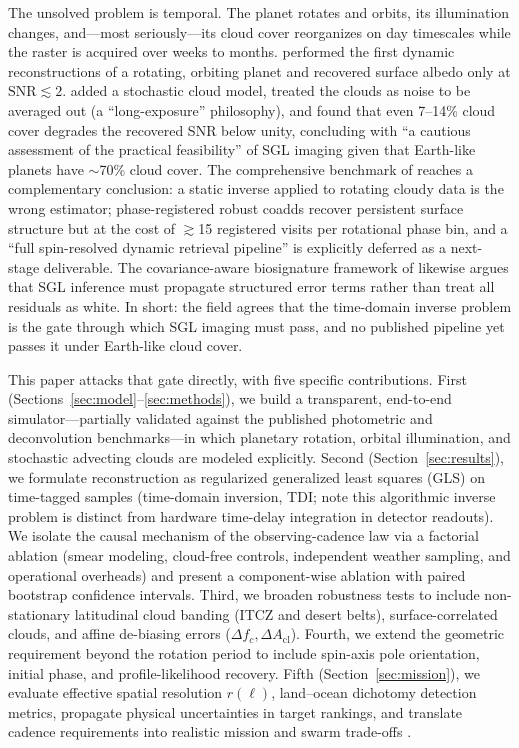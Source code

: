\documentclass[twocolumn,10pt]{article}
\begin{document}
The unsolved problem is temporal. The planet rotates and orbits, its
illumination changes, and---most seriously---its cloud cover reorganizes
on day timescales while the raster is acquired over weeks to months.
\citet{toth23} performed the first dynamic reconstructions of a rotating,
orbiting planet and recovered surface albedo only at
$\mathrm{SNR}\lesssim2$. \citet{toth25clouds} added a stochastic cloud
model, treated the clouds as noise to be averaged out (a
``long-exposure'' philosophy), and found that even 7--14\% cloud cover
degrades the recovered SNR below unity, concluding with ``a cautious
assessment of the practical feasibility'' of SGL imaging given that
Earth-like planets have $\sim$70\% cloud cover. The comprehensive
benchmark of \citet{tur26bench} reaches a complementary conclusion: a
static inverse applied to rotating cloudy data is the wrong estimator;
phase-registered robust coadds recover persistent surface structure but
at the cost of $\gtrsim$15 registered visits per rotational phase bin,
and a ``full spin-resolved dynamic retrieval pipeline'' is explicitly
deferred as a next-stage deliverable. The covariance-aware biosignature
framework of \citet{cov26} likewise argues that SGL inference must
propagate structured error terms rather than treat all residuals as
white. In short: the field agrees that the time-domain inverse problem is
the gate through which SGL imaging must pass, and no published pipeline
yet passes it under Earth-like cloud cover.

This paper attacks that gate directly, with five specific contributions.
First (Sections~\ref{sec:model}--\ref{sec:methods}), we build a transparent,
end-to-end simulator---partially validated against the published photometric
and deconvolution benchmarks---in which planetary rotation, orbital
illumination, and stochastic advecting clouds are modeled explicitly.
Second (Section~\ref{sec:results}), we formulate reconstruction as regularized
generalized least squares (GLS) on time-tagged samples (time-domain inversion,
TDI; note this algorithmic inverse problem is distinct from hardware
time-delay integration in detector readouts). We isolate the causal mechanism
of the observing-cadence law via a factorial ablation (smear modeling,
cloud-free controls, independent weather sampling, and operational overheads)
and present a component-wise ablation with paired bootstrap confidence intervals.
Third, we broaden robustness tests to include non-stationary latitudinal cloud
banding (ITCZ and desert belts), surface-correlated clouds, and affine
de-biasing errors ($\Delta f_c, \Delta A_{\text{cl}}$). Fourth, we extend the
geometric requirement beyond the rotation period to include spin-axis pole
orientation, initial phase, and profile-likelihood recovery. Fifth
(Section~\ref{sec:mission}), we evaluate effective spatial resolution $r(\ell)$,
land--ocean dichotomy detection metrics, propagate physical uncertainties in
target rankings, and translate cadence requirements into realistic mission and
swarm trade-offs \citep{niac20,helvajian23,friedman24,tur26prop}.
\end{document}
